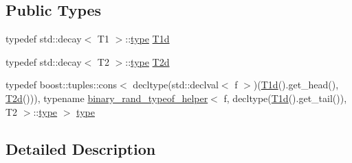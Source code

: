 \subsection*{Public Types}
\begin{DoxyCompactItemize}
\item 
typedef std\+::decay$<$ T1 $>$\+::\hyperlink{structIceBRG_1_1tuples_1_1binary__rand__typeof__helper_3_01f_00_01T1_00_01T2_00_01BRG__S__IS__TU0ef4e05af1a56449fbbcc207cdc65c2c_a2a9c1f9d7659014bcf48e89fffdc0996}{type} \hyperlink{structIceBRG_1_1tuples_1_1binary__rand__typeof__helper_3_01f_00_01T1_00_01T2_00_01BRG__S__IS__TU0ef4e05af1a56449fbbcc207cdc65c2c_ab02588e3475a5d41b58a5bbea30b5676}{T1d}
\item 
typedef std\+::decay$<$ T2 $>$\+::\hyperlink{structIceBRG_1_1tuples_1_1binary__rand__typeof__helper_3_01f_00_01T1_00_01T2_00_01BRG__S__IS__TU0ef4e05af1a56449fbbcc207cdc65c2c_a2a9c1f9d7659014bcf48e89fffdc0996}{type} \hyperlink{structIceBRG_1_1tuples_1_1binary__rand__typeof__helper_3_01f_00_01T1_00_01T2_00_01BRG__S__IS__TU0ef4e05af1a56449fbbcc207cdc65c2c_af1be0eb66d8e56e081b0c64fb6d881f3}{T2d}
\item 
typedef boost\+::tuples\+::cons$<$ decltype(std\+::declval$<$ f $>$)(\hyperlink{structIceBRG_1_1tuples_1_1binary__rand__typeof__helper_3_01f_00_01T1_00_01T2_00_01BRG__S__IS__TU0ef4e05af1a56449fbbcc207cdc65c2c_ab02588e3475a5d41b58a5bbea30b5676}{T1d}().get\+\_\+head(), \hyperlink{structIceBRG_1_1tuples_1_1binary__rand__typeof__helper_3_01f_00_01T1_00_01T2_00_01BRG__S__IS__TU0ef4e05af1a56449fbbcc207cdc65c2c_af1be0eb66d8e56e081b0c64fb6d881f3}{T2d}())), typename \hyperlink{namespaceIceBRG_1_1tuples_structIceBRG_1_1tuples_1_1binary__rand__typeof__helper}{binary\+\_\+rand\+\_\+typeof\+\_\+helper}$<$ f, decltype(\hyperlink{structIceBRG_1_1tuples_1_1binary__rand__typeof__helper_3_01f_00_01T1_00_01T2_00_01BRG__S__IS__TU0ef4e05af1a56449fbbcc207cdc65c2c_ab02588e3475a5d41b58a5bbea30b5676}{T1d}().get\+\_\+tail()), T2 $>$\+::\hyperlink{structIceBRG_1_1tuples_1_1binary__rand__typeof__helper_3_01f_00_01T1_00_01T2_00_01BRG__S__IS__TU0ef4e05af1a56449fbbcc207cdc65c2c_a2a9c1f9d7659014bcf48e89fffdc0996}{type} $>$ \hyperlink{structIceBRG_1_1tuples_1_1binary__rand__typeof__helper_3_01f_00_01T1_00_01T2_00_01BRG__S__IS__TU0ef4e05af1a56449fbbcc207cdc65c2c_a2a9c1f9d7659014bcf48e89fffdc0996}{type}
\end{DoxyCompactItemize}


\subsection{Detailed Description}
